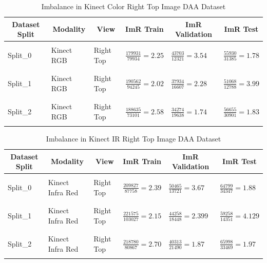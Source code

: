 \begin{table}[htbp]
\caption{Imbalance in Kinect Color Right Top Image DAA Dataset}
\label{rgb imbalance-table}
\begin{center}
\small
\begin{tabular}{llllll}
\multicolumn{1}{c}{\bf Dataset Split}  &\multicolumn{1}{c}{\bf Modality} &\multicolumn{1}{c}{\bf View} &\multicolumn{1}{c}{\bf ImR Train} &\multicolumn{1}{c}{\bf ImR Validation} &\multicolumn{1}{c}{\bf ImR Test}
\\ \hline \\
Split\_0         &Kinect RGB  &Right Top  &$\frac{179931}{79934} = 2.25$ & $\frac{43703}{12321} = 3.54$ & $\frac{55930}{31385} = 1.78$  \\
\\ \hline \\
Split\_1             &Kinect RGB  &Right Top  &$\frac{190562}{94245} = 2.02$ & $\frac{37934}{16607} = 2.28$ & $\frac{51068}{12788} = 3.99$ \\
\\ \hline \\
Split\_2             &Kinect RGB & Right Top & $\frac{188635}{73101} = 2.58$ & $\frac{34274}{19638} = 1.74$ & $\frac{56655}{30901} = 1.83$\\
\\ \hline
\end{tabular}
\end{center}
\end{table}

\begin{table}[htbp]
\caption{Imbalance in Kinect IR Right Top Image DAA Dataset}
\label{kir imbalance-table}
\begin{center}
\small
\begin{tabular}{llllll}
\multicolumn{1}{c}{\bf Dataset Split}  &\multicolumn{1}{c}{\bf Modality} &\multicolumn{1}{c}{\bf View} &\multicolumn{1}{c}{\bf ImR Train} &\multicolumn{1}{c}{\bf ImR Validation} &\multicolumn{1}{c}{\bf ImR Test}
\\ \hline \\
Split\_0         &Kinect Infra Red  &Right Top  & $\frac{209827}{87758} = 2.39$ & $\frac{50465}{13721} = 3.67$ & $\frac{64799}{34347} = 1.88$ \\
\\ \hline \\
Split\_1             &Kinect Infra Red  &Right Top  & $\frac{221575}{103027} = 2.15$ & $\frac{44258}{18448} = 2.399$ & $\frac{59258}{14351} = 4.129$ \\
\\ \hline \\
Split\_2             &Kinect Infra Red & Right Top & $\frac{218780}{80867} = 2.70$ & $\frac{40313}{21490} = 1.87$ & $\frac{65998}{33469} = 1.97$  \\
\\ \hline
\end{tabular}
\end{center}
\end{table}


